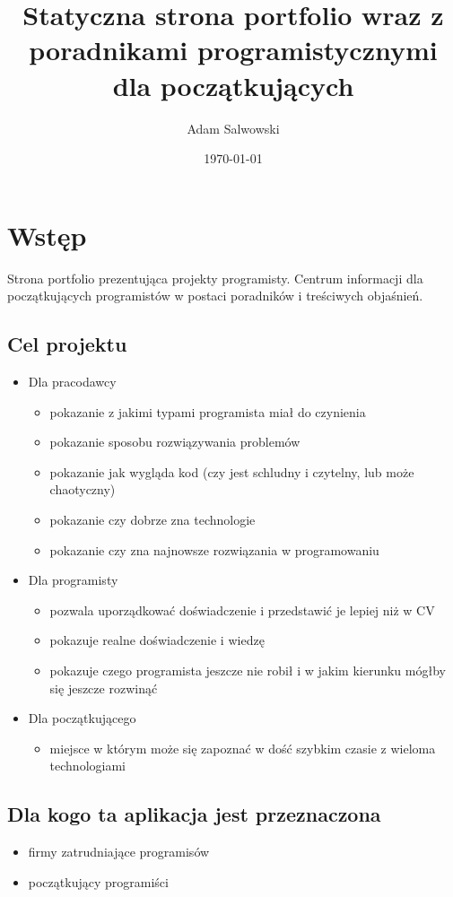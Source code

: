 \documentclass[11pt]{article}
\author{Adam Salwowski}
\date{\today}
\title{Statyczna strona portfolio wraz z poradnikami programistycznymi dla początkujących}
\begin{document}
\maketitle
\tableofcontents

\section{Wstęp}
\label{sec:org058dcf7}
Strona portfolio prezentująca projekty programisty. Centrum informacji dla początkujących programistów w postaci poradników i treściwych objaśnień.
\subsection{Cel projektu}
\label{sec:org323519e}
\begin{itemize}
\item Dla pracodawcy
\begin{itemize}
\item pokazanie z jakimi typami programista miał do czynienia
\item pokazanie sposobu rozwiązywania problemów
\item pokazanie jak wygląda kod (czy jest schludny i czytelny, lub może chaotyczny)
\item pokazanie czy dobrze zna technologie
\item pokazanie czy zna najnowsze rozwiązania w programowaniu
\end{itemize}
\item Dla programisty
\begin{itemize}
\item pozwala uporządkować doświadczenie i przedstawić je lepiej niż w CV
\item pokazuje realne doświadczenie i wiedzę
\item pokazuje czego programista jeszcze nie robił i w jakim kierunku mógłby się jeszcze rozwinąć
\end{itemize}
\item Dla początkującego
\begin{itemize}
\item miejsce w którym może się zapoznać w dość szybkim czasie z wieloma technologiami
\end{itemize}
\end{itemize}
\subsection{Dla kogo ta aplikacja jest przeznaczona}
\label{sec:org3682795}
\begin{itemize}
\item firmy zatrudniające programisów
\item początkujący programiści
\end{itemize}
\end{document}
